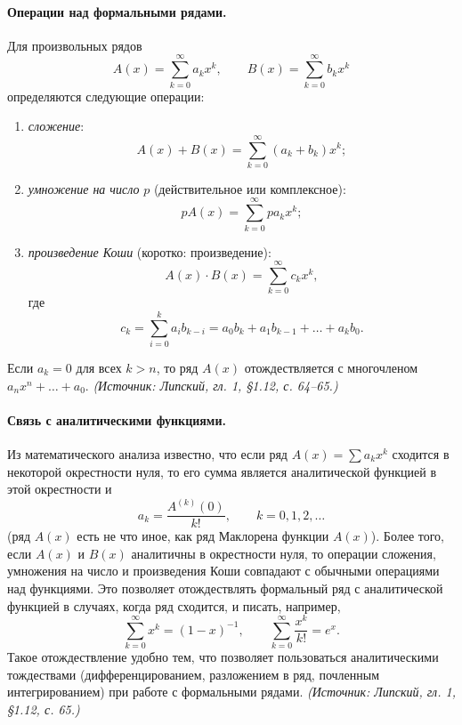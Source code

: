 \documentclass[a4paper,12pt]{article}
\begin{document}
\paragraph{Операции над формальными рядами.}
Для произвольных рядов
\[
A(x)=\sum_{k=0}^{\infty}a_kx^k,
\qquad
B(x)=\sum_{k=0}^{\infty}b_kx^k
\]
определяются следующие операции:
\begin{enumerate}[label=\arabic*)]
\item \emph{сложение}:
\[
A(x)+B(x)=\sum_{k=0}^{\infty}(a_k+b_k)x^k;
\]
\item \emph{умножение на число} \(p\) (действительное или комплексное):
\[
pA(x)=\sum_{k=0}^{\infty}pa_kx^k;
\]
\item \emph{произведение Коши} (коротко: произведение):
\[
A(x)\cdot B(x)=\sum_{k=0}^{\infty}c_kx^k,
\]
где
\[
c_k=\sum_{i=0}^{k}a_ib_{k-i}=a_0b_k+a_1b_{k-1}+\dots+a_kb_0.
\]
\end{enumerate}
Если \(a_k=0\) для всех \(k>n\), то ряд \(A(x)\) отождествляется с многочленом \(a_nx^n+\dots+a_0\).
\textit{(Источник: Липский, гл. 1, §1.12, с. 64--65.)}

\paragraph{Связь с аналитическими функциями.}
Из математического анализа известно, что если ряд \(A(x)=\sum a_kx^k\) сходится в некоторой окрестности нуля, то его сумма является аналитической функцией в этой окрестности и
\[
a_k=\frac{A^{(k)}(0)}{k!},\qquad k=0,1,2,\dots
\]
(ряд \(A(x)\) есть не что иное, как ряд Маклорена функции \(A(x)\)). Более того, если \(A(x)\) и \(B(x)\) аналитичны в окрестности нуля, то операции сложения, умножения на число и произведения Коши совпадают с обычными операциями над функциями. Это позволяет отождествлять формальный ряд с аналитической функцией в случаях, когда ряд сходится, и писать, например,
\[
\sum_{k=0}^{\infty}x^k=(1-x)^{-1},
\qquad
\sum_{k=0}^{\infty}\frac{x^k}{k!}=e^x.
\]
Такое отождествление удобно тем, что позволяет пользоваться аналитическими тождествами (дифференцированием, разложением в ряд, почленным интегрированием) при работе с формальными рядами.
\textit{(Источник: Липский, гл. 1, §1.12, с. 65.)}
\end{document}
